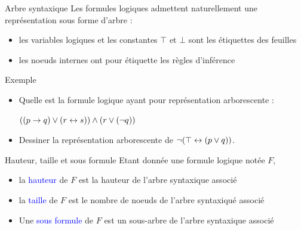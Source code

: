 \documentclass[10pt]{beamer}
\begin{document}
\begin{frame}{\Ctitle}{\stitle}
	\begin{block}{Arbre syntaxique}
		Les formules logiques admettent naturellement une représentation sous forme d'arbre :
		\begin{itemize}
			\item<2-> les variables logiques et les constantes $\top$ et $\bot$ sont les étiquettes des feuilles
			\item<3-> les noeuds internes ont pour étiquette les règles d'inférence
		\end{itemize}
	\end{block}
\end{frame}

\begin{frame}{\Ctitle}{\stitle}
	\begin{exampleblock}{Exemple}
		\begin{itemize}
			\item Quelle est la formule logique ayant pour représentation arborescente :
			      \begin{center}
			      \end{center}
			      \textcolor{OliveGreen}{$ ((p \to q) \vee (r \leftrightarrow s)) \wedge (r \vee (\neg q)) $}
			\item<3-> Dessiner la représentation arborescente de $ \neg(\top \leftrightarrow (p \vee q))$.
		\end{itemize}
	\end{exampleblock}
\end{frame}

\begin{frame}{\Ctitle}{\stitle}
	\begin{block}{Hauteur, taille et sous formule}
		Etant donnée une formule logique notée  $F$,
		\begin{itemize}
			\item<2-> la \textcolor{blue}{hauteur} de  $F$ est la hauteur de l'arbre syntaxique associé
			\item<3-> la \textcolor{blue}{taille} de  $F$ est le nombre de noeuds de l'arbre syntaxiqué associé
			\item<4-> Une \textcolor{blue}{sous formule} de  $F$ est un sous-arbre de l'arbre syntaxique associé
		\end{itemize}
	\end{block}
\end{frame}
\end{document}
